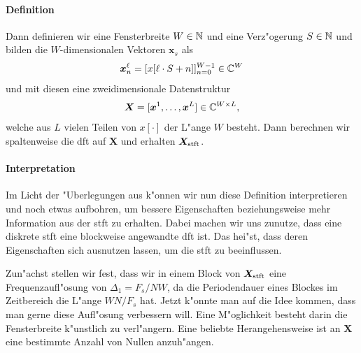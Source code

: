\paragraph{Definition}
%
Dann definieren wir eine Fensterbreite $W \in \mathbb{N}$ und eine Verz"ogerung $S \in \mathbb{N}$ und bilden die $W$-dimensionalen Vektoren $\bm x_s$ als
\[
\bm x^\ell_n = [x[\ell \cdot S + n]]_{n = 0}^{W-1} \in \mathbb{C}^{W}
\]
und mit diesen eine zweidimensionale Datenstruktur
\[
\bm X = [\bm x^1, \ldots, \bm x^L] \in \mathbb{C}^{W \times L},
\]
welche aus $L$ vielen Teilen von $x[\cdot]$ der L"ange $W$ besteht.
Dann berechnen wir spaltenweise die \gls{dft} auf $\bm X$ und erhalten $\bm X_{\rm stft}$.
%
\paragraph{Interpretation}
%
Im Licht der "Uberlegungen aus  k"onnen wir nun diese Definition interpretieren und noch etwas aufbohren, um bessere Eigenschaften beziehungsweise mehr Information aus der \gls{stft} zu erhalten.
Dabei machen wir uns zunutze, dass eine diskrete \gls{stft}  eine blockweise angewandte \gls{dft} ist.
Das hei"st, dass deren Eigenschaften sich ausnutzen lassen, um die \gls{stft} zu beeinflussen.


\clearpage
Zun"achst stellen wir fest, dass wir in einem Block von $\bm{X}_{\rm stft}$ eine Frequenzaufl"osung von $\Delta_1 = F_s / {N W}$, da die Periodendauer eines Blockes im Zeitbereich die L"ange ${WN}/F_s$ hat.
Jetzt k"onnte man auf die Idee kommen, dass man gerne diese Aufl"osung verbessern will.
Eine M"oglichkeit besteht darin die Fensterbreite k"unstlich zu verl"angern.
Eine beliebte Herangehensweise ist an $\bm{X}$ eine bestimmte Anzahl von Nullen anzuh"angen.

